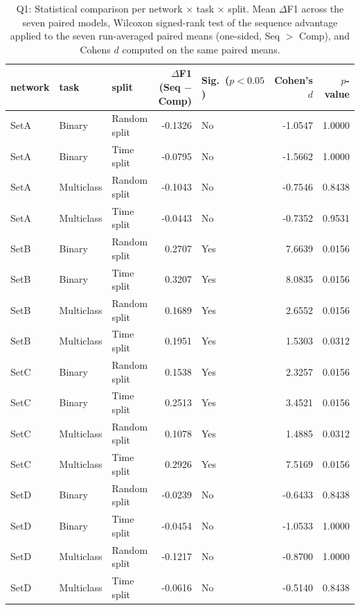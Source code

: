 \begin{table}
\caption{Q1: Statistical comparison per network $\times$ task $\times$ split. Mean $\Delta$F1 across the seven paired models, Wilcoxon signed-rank test of the sequence advantage applied to the seven run-averaged paired means (one-sided, Seq $>$ Comp), and Cohen\textquotesingle{}s $d$ computed on the same paired means.}
\label{tab:q1_stats}
\begin{tabular}{lllrlrr}
\toprule
network & task & split & $\Delta$F1 (Seq $-$ Comp) & Sig.\ ($p<0.05$) & Cohen's $d$ & $p$-value \\
\midrule
SetA & Binary & Random split & -0.1326 & No & -1.0547 & 1.0000 \\
SetA & Binary & Time split & -0.0795 & No & -1.5662 & 1.0000 \\
SetA & Multiclass & Random split & -0.1043 & No & -0.7546 & 0.8438 \\
SetA & Multiclass & Time split & -0.0443 & No & -0.7352 & 0.9531 \\
SetB & Binary & Random split & 0.2707 & Yes & 7.6639 & 0.0156 \\
SetB & Binary & Time split & 0.3207 & Yes & 8.0835 & 0.0156 \\
SetB & Multiclass & Random split & 0.1689 & Yes & 2.6552 & 0.0156 \\
SetB & Multiclass & Time split & 0.1951 & Yes & 1.5303 & 0.0312 \\
SetC & Binary & Random split & 0.1538 & Yes & 2.3257 & 0.0156 \\
SetC & Binary & Time split & 0.2513 & Yes & 3.4521 & 0.0156 \\
SetC & Multiclass & Random split & 0.1078 & Yes & 1.4885 & 0.0312 \\
SetC & Multiclass & Time split & 0.2926 & Yes & 7.5169 & 0.0156 \\
SetD & Binary & Random split & -0.0239 & No & -0.6433 & 0.8438 \\
SetD & Binary & Time split & -0.0454 & No & -1.0533 & 1.0000 \\
SetD & Multiclass & Random split & -0.1217 & No & -0.8700 & 1.0000 \\
SetD & Multiclass & Time split & -0.0616 & No & -0.5140 & 0.8438 \\
\bottomrule
\end{tabular}
\end{table}
